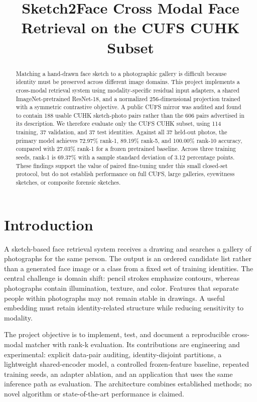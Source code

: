 \documentclass[cameraready]{ieeeconf}
\title{Sketch2Face Cross Modal Face Retrieval on the CUFS CUHK Subset}
\begin{document}
\maketitle

\begin{abstract}

Matching a hand-drawn face sketch to a photographic gallery is difficult because identity must be preserved across different image domains. This project implements a cross-modal retrieval system using modality-specific residual input adapters, a shared ImageNet-pretrained ResNet-18, and a normalized 256-dimensional projection trained with a symmetric contrastive objective. A public CUFS mirror was audited and found to contain 188 usable CUHK sketch-photo pairs rather than the 606 pairs advertised in its description. We therefore evaluate only the CUFS CUHK subset, using 114 training, 37 validation, and 37 test identities. Against all 37 held-out photos, the primary model achieves 72.97\% rank-1, 89.19\% rank-5, and 100.00\% rank-10 accuracy, compared with 27.03\% rank-1 for a frozen pretrained baseline. Across three training seeds, rank-1 is 69.37\% with a sample standard deviation of 3.12 percentage points. These findings support the value of paired fine-tuning under this small closed-set protocol, but do not establish performance on full CUFS, large galleries, eyewitness sketches, or composite forensic sketches.

\end{abstract}

\section{Introduction}

A sketch-based face retrieval system receives a drawing and searches a gallery of photographs for the same person. The output is an ordered candidate list rather than a generated face image or a class from a fixed set of training identities. The central challenge is domain shift: pencil strokes emphasize contours, whereas photographs contain illumination, texture, and color. Features that separate people within photographs may not remain stable in drawings. A useful embedding must retain identity-related structure while reducing sensitivity to modality.


The project objective is to implement, test, and document a reproducible cross-modal matcher with rank-k evaluation. Its contributions are engineering and experimental: explicit data-pair auditing, identity-disjoint partitions, a lightweight shared-encoder model, a controlled frozen-feature baseline, repeated training seeds, an adapter ablation, and an application that uses the same inference path as evaluation. The architecture combines established methods; no novel algorithm or state-of-the-art performance is claimed.
\end{document}
